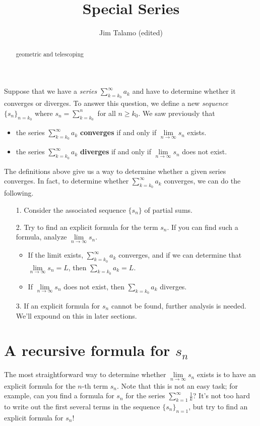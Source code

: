 \documentclass{ximera}
\author{Jim Talamo (edited)}
\title{Special Series}
\begin{document}
\begin{abstract}
geometric and telescoping
\end{abstract}
\maketitle

Suppose that we have a \emph{series} $\sum\limits_{k=k_0}^{\infty} a_k$ and have to determine whether it converges or diverges.  To answer this question, we define a new \emph{sequence} $\{s_n\}_{n=k_0}$ where $s_n = \sum\limits_{k=k_0}^{n}$ for all $n \geq k_0$.  We saw previously that
 
 \begin{itemize}
\item the series $\sum\limits_{k=k_0}^\infty a_k$ \textbf{converges} if and only if $\lim\limits_{n\to\infty} s_n$ exists.  
\item the series $\sum\limits_{k=k_0}^\infty a_k$ \textbf{diverges} if and only if $\lim\limits_{n\to\infty} s_n$ does not exist.  
\end{itemize}

The definitions above give us a way to determine whether a given series converges.  In fact, to determine whether $\sum_{k=k_0}^{\infty} a_k$ converges, we can do the following.

\begin{itemize}
\item[1.] Consider the associated sequence $\{s_n\}$ of partial sums.
\item[2.] Try to find an explicit formula for the term $s_n$.  If you can find such a formula, analyze $\lim\limits_{n \to \infty} s_n$.  
\begin{itemize}
\item If the limit exists, $\sum\limits_{k=k_0}^{\infty} a_k$ converges, and if we can determine that $\lim\limits_{n \to \infty} s_n =L$, then $\sum\limits_{k=k_0} a_k=L$.  \item If  $\lim\limits_{n \to \infty} s_n$ does not exist, then $\sum\limits_{k=k_0} a_k$ diverges.
\end{itemize}
\item[3.] If an explicit formula for $s_n$ cannot be found, further analysis is needed.  We'll expound on this in later sections.
\end{itemize}


\section{A recursive formula for $s_n$}
The most straightforward way to determine whether $\lim\limits_{n \to \infty} s_n$ exists is to have an explicit formula for the $n$-th term $s_n$.  Note that this is not an easy task; for example, can you find a formula for $s_n$ for the series $\sum\limits_{k=1}^{\infty} \frac{1}{k}$? It's not too hard to write out the first several terms in the sequence $\{s_n\}_{n=1}$, but try to find an explicit formula for $s_n$!
\end{document}
